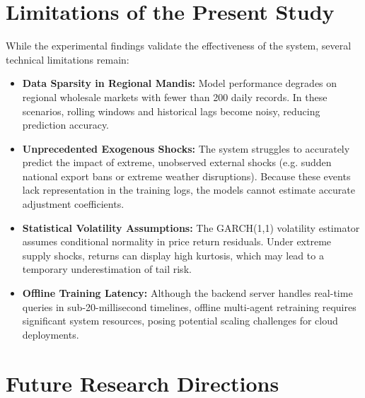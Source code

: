 \documentclass[12pt,a4paper]{report}
\theoremstyle{definition}
\theoremstyle{remark}
\begin{document}
\section{Limitations of the Present Study}

While the experimental findings validate the effectiveness of the system, several technical limitations remain:
\begin{itemize}
    \item \textbf{Data Sparsity in Regional Mandis:} Model performance degrades on regional wholesale markets with fewer than 200 daily records. In these scenarios, rolling windows and historical lags become noisy, reducing prediction accuracy.
    \item \textbf{Unprecedented Exogenous Shocks:} The system struggles to accurately predict the impact of extreme, unobserved external shocks (e.g. sudden national export bans or extreme weather disruptions). Because these events lack representation in the training logs, the models cannot estimate accurate adjustment coefficients.
    \item \textbf{Statistical Volatility Assumptions:} The GARCH(1,1) volatility estimator assumes conditional normality in price return residuals. Under extreme supply shocks, returns can display high kurtosis, which may lead to a temporary underestimation of tail risk.
    \item \textbf{Offline Training Latency:} Although the backend server handles real-time queries in sub-20-millisecond timelines, offline multi-agent retraining requires significant system resources, posing potential scaling challenges for cloud deployments.
\end{itemize}

\section{Future Research Directions}
\end{document}
